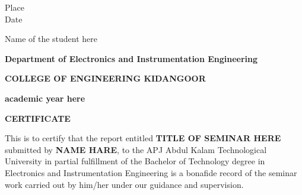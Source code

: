 \documentclass[12pt,a4paper]{report}
\begin{document}
\noindent \begin{minipage}{0.45\linewidth}
\begin{flushleft}
\vspace{1 cm}
                         
Place \\
Date\\

\end{flushleft} 
\end{minipage}
\hfill
\begin{minipage}{0.45\linewidth}
\begin{flushright}                                      
\vspace{1cm}
                         
Name of the student here\\


\end{flushright} 
\end{minipage}

\thispagestyle{empty}

\newpage
\begin{center}


\textbf{Department of Electronics and Instrumentation Engineering}

\textbf{COLLEGE OF ENGINEERING KIDANGOOR}


\textbf{academic year here}
\end{center}
\begin{center}

\end{center}
\vspace{0.2cm}
\begin{center}
 \textbf{CERTIFICATE}
\end{center}

This is to certify that the report entitled \textbf{ \large TITLE OF SEMINAR HERE} submitted by \textbf{NAME HARE}, to the APJ Abdul Kalam Technological University in partial fulfillment of the Bachelor of Technology degree in Electronics and Instrumentation Engineering is a bonafide record of the seminar work carried out by him/her under our guidance and supervision.
\vspace{3cm}
\end{document}

